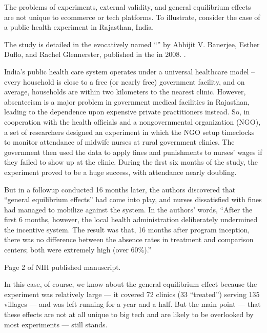 \documentclass[letterpaper,10pt,english]{jupyterBook}
\begin{document}
\sphinxAtStartPar
The problems of experiments, external validity, and general equilibrium effects are not unique to e\sphinxhyphen{}commerce or tech platforms. To illustrate, consider the case of a public health experiment in Rajasthan, India.%
\begin{footnote}[2]\sphinxAtStartFootnote
The study is detailed in the evocatively named “” by Abhijit V. Banerjee, Esther Duflo, and Rachel Glennerster, published in the  in 2008. .
%
\end{footnote} India’s public health care system operates under a universal healthcare model – every household is close to a free (or nearly free) government facility, and on average, households are within two kilometers to the nearest clinic. However, absenteeism is a major problem in government medical facilities in Rajasthan, leading to the dependence upon expensive private practitioners instead. So, in cooperation with the health officials and a nongovernmental organization (NGO), a set of researchers designed an experiment in which the NGO setup timeclocks to monitor attendance of midwife nurses at rural government clinics. The government then used the data to apply fines and punishments to nurses’ wages if they failed to show up at the clinic. During the first six months of the study, the experiment proved to be a huge success, with attendance nearly doubling.

\sphinxAtStartPar
But in a follow\sphinxhyphen{}up conducted 16 months later, the authors discovered that “general equilibrium effects” had come into play, and nurses dissatisfied with fines had managed to mobilize against the system. In the authors’ words, “After the first 6 months, however, the local health administration deliberately undermined the incentive system. The result was that, 16 months after program inception, there was no difference between the absence rates in treatment and comparison centers; both were extremely high (over 60\%).”%
\begin{footnote}[3]\sphinxAtStartFootnote
Page 2 of NIH published manuscript.
%
\end{footnote}

\sphinxAtStartPar
In this case, of course, we know about the general equilibrium effect because the experiment was relatively large — it covered 72 clinics (33 “treated”) serving 135 villages — and was left running for a year and a half. But the main point — that these effects are not at all unique to big tech and are likely to be overlooked by most experiments — still stands.
\end{document}
